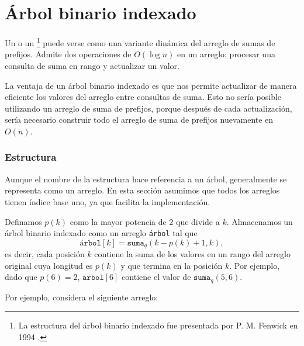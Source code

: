 \section{Árbol binario indexado}


Un  o un \footnote{La
    estructura del árbol binario indexado fue presentada por P. M. Fenwick en 1994 \cite{fen94}.}
puede verse como una variante dinámica del arreglo de sumas de prefijos.
Admite dos operaciones de $O(\log n)$ en un arreglo:
procesar una consulta de suma en rango y actualizar un valor.

La ventaja de un árbol binario indexado es
que nos permite actualizar de manera eficiente
los valores del arreglo entre consultas de suma.
Esto no sería posible utilizando un arreglo de suma de prefijos,
porque después de cada actualización, sería necesario construir todo
el arreglo de suma de prefijos nuevamente en $O(n)$.

\subsubsection{Estructura}

Aunque el nombre de la estructura hace referencia a un árbol,
generalmente se representa como un arreglo.
En esta sección asumimos que todos los arreglos tienen índice base uno,
ya que facilita la implementación.

Definamos $p(k)$ como la mayor potencia de 2 que
divide a $k$.
Almacenamos un árbol binario indexado como un arreglo \texttt{árbol}
tal que
\[ \texttt{árbol}[k] = \texttt{suma}_q(k-p(k)+1,k),\]
es decir, cada posición $k$ contiene la suma de los valores
en un rango del arreglo original cuya longitud es $p(k)$
y que termina en la posición $k$.
Por ejemplo, dado que $p(6)=2$, $\texttt{arbol}[6]$
contiene el valor de $\texttt{suma}_q(5,6)$.

Por ejemplo, considera el siguiente arreglo:
\begin{center}
\end{center}

